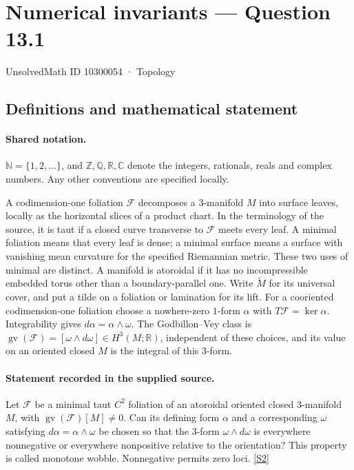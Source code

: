 \documentclass[11pt]{article}
\newcommand{\sref}[2]{\hyperlink{source:#1:#2}{[S#2]}}
\begin{document}
\setcounter{section}{10300053}
\section{Numerical invariants — Question 13.1}\label{10300054}
{\small\sffamily UnsolvedMath ID 10300054 · Topology}
\subsection{Definitions and mathematical statement}

\paragraph{Shared notation.}$\mathbb N=\{1,2,\ldots\}$, and $\mathbb Z,\mathbb Q,\mathbb R,\mathbb C$ denote the integers, rationals, reals and complex numbers. Any other conventions are specified locally.


A codimension-one foliation $\mathcal F$ decomposes a $3$-manifold $M$ into surface leaves, locally as the horizontal slices of a product chart. In the terminology of the source, it is taut if a closed curve transverse to $\mathcal F$ meets every leaf. A minimal foliation means that every leaf is dense; a minimal surface means a surface with vanishing mean curvature for the specified Riemannian metric. These two uses of minimal are distinct. A manifold is atoroidal if it has no incompressible embedded torus other than a boundary-parallel one. Write $\widetilde M$ for its universal cover, and put a tilde on a foliation or lamination for its lift. For a cooriented codimension-one foliation choose a nowhere-zero $1$-form $\alpha$ with $T\mathcal F=\ker\alpha$. Integrability gives $d\alpha=\alpha\wedge\omega$. The Godbillon--Vey class is $\operatorname{gv}(\mathcal F)=[\omega\wedge d\omega]\in H^3(M;\mathbb R)$, independent of these choices, and its value on an oriented closed $M$ is the integral of this $3$-form.
\paragraph{Statement recorded in the supplied source.}
Let $\mathcal F$ be a minimal taut $C^2$ foliation of an atoroidal oriented closed $3$-manifold $M$, with $\operatorname{gv}(\mathcal F)[M]\ne0$. Can its defining form $\alpha$ and a corresponding $\omega$ satisfying $d\alpha=\alpha\wedge\omega$ be chosen so that the $3$-form $\omega\wedge d\omega$ is everywhere nonnegative or everywhere nonpositive relative to the orientation? This property is called monotone wobble. Nonnegative permits zero loci. \sref{10300054}{2}
\end{document}
